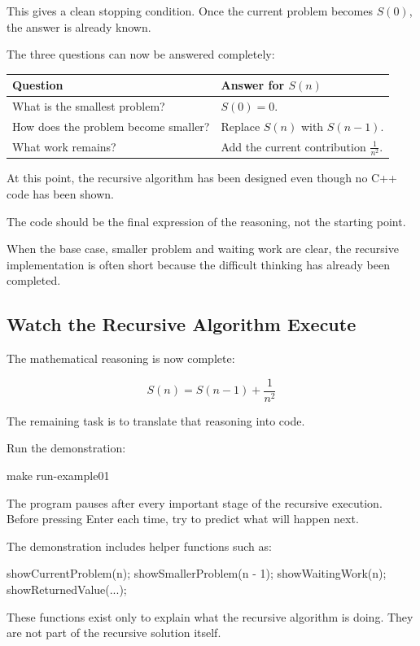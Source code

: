 \documentclass{csc2059practical}
\begin{document}
This gives a clean stopping condition. Once the current problem becomes
\(S(0)\), the answer is already known.

The three questions can now be answered completely:

\begin{center}
\begin{tabular}{p{} p{}}
\toprule
\textbf{Question} & \textbf{Answer for \(S(n)\)} \\
\midrule
What is the smallest problem? & \(S(0)=0\). \\
How does the problem become smaller? & Replace \(S(n)\) with \(S(n-1)\). \\
What work remains? & Add the current contribution
\(\frac{1}{n^2}\). \\
\bottomrule
\end{tabular}
\end{center}

At this point, the recursive algorithm has been designed even though no C++
code has been shown.

\begin{importantnote}
The code should be the final expression of the reasoning, not the starting
point.

When the base case, smaller problem and waiting work are clear, the recursive
implementation is often short because the difficult thinking has already been
completed.
\end{importantnote}

\subsection{Watch the Recursive Algorithm Execute}

The mathematical reasoning is now complete:

\[
S(n)=S(n-1)+\frac{1}{n^2}
\]

The remaining task is to translate that reasoning into code.

Run the demonstration:

\begin{terminal}
make run-example01
\end{terminal}

The program pauses after every important stage of the recursive execution.
Before pressing Enter each time, try to predict what will happen next.

\begin{importantnote}
The demonstration includes helper functions such as:

\begin{cppcode}
showCurrentProblem(n);
showSmallerProblem(n - 1);
showWaitingWork(n);
showReturnedValue(...);
\end{cppcode}

These functions exist only to explain what the recursive algorithm is doing.
They are not part of the recursive solution itself.
\end{importantnote}
\end{document}
